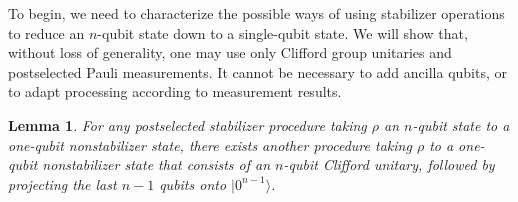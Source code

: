 \documentclass[11pt]{article}
\def\ket #1{\vert #1\rangle}
\newtheorem{lemma}{Lemma}
\theoremstyle{note}
\begin{document}
To begin, we need to characterize the possible ways of using stabilizer operations to reduce an $n$-qubit state down to a single-qubit state.  We will show that, without loss of generality, one may use only Clifford group unitaries and postselected Pauli measurements.  It cannot be necessary to add ancilla qubits, or to adapt processing according to measurement results.  

\begin{lemma} \label{t:noancillasneeded}
For any postselected stabilizer procedure taking $\rho$ an $n$-qubit state to a one-qubit nonstabilizer state, there exists another procedure taking $\rho$ to a one-qubit nonstabilizer state that consists of an $n$-qubit Clifford unitary, followed by projecting the last $n-1$ qubits onto $\ket{0^{n-1}}$.
\end{lemma}
\end{document}
